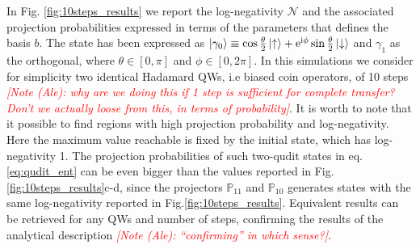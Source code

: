 \documentclass[
	aps, pra,
	superscriptaddress, twocolumn,
	floatfix,
	10pt
]{revtex4-1}
\newcommand{\parTitle}[1]{\noindent{\color{Mahogany}(\emph{#1})}}
\newcommand{\PP}{\mathbb{P}}
\newcommand{\commale}[1]{{\textcolor{red} {\it{[Note (Ale): #1]}}}}
\renewcommand{\parTitle}[1]{}
\begin{document}

\parTitle{Case with same QW on both sides}
In Fig. \ref{fig:10steps_results} we report the log-negativity $\mathcal{N}$ and the associated projection probabilities expressed in terms of the parameters that defines the basis $b$. The state has been expressed as $\ket{\gamma_0}\equiv\cos{\frac{\theta}{2}} \ket{\uparrow}+ 
 \mathrm{e}^{\mathrm{i}\phi}\sin{\frac{\theta}{2}}\ket{\downarrow}$ and $\gamma_1$ as the orthogonal,
where $\theta \in [0, \pi ]$ and $\phi \in [0, 2\pi]$. In this simulations we consider for simplicity two identical Hadamard QWs, i.e biased coin operators, of 10 steps \commale{why are we doing this if 1 step is sufficient for complete transfer? Don't we actually loose from this, in terms of probability}. It is worth to note that it possible to find regions with high projection probability and log-negativity. Here the maximum value reachable is fixed by the initial state, which has log-negativity 1. The projection probabilities of such two-qudit states in eq.\eqref{eq:qudit_ent} can be even bigger than the values reported in Fig.\ref{fig:10steps_results}c-d, since the projectors $\PP_{11}$ and $\PP_{10}$ generates states with the same log-negativity reported in Fig.\ref{fig:10steps_results}.
Equivalent results can be retrieved for any QWs and number of steps, confirming the results of the analytical description \commale{``confirming'' in which sense?}. 
\end{document}
